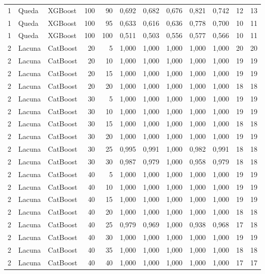 \begin{longtable}{@{}rllrrrrrrrrr@{}}
1 & Queda & XGBoost & 100 & 90 & 0,692 & 0,682 & 0,676 & 0,821 & 0,742 & 12 & 13 \\
1 & Queda & XGBoost & 100 & 95 & 0,633 & 0,616 & 0,636 & 0,778 & 0,700 & 10 & 11 \\
1 & Queda & XGBoost & 100 & 100 & 0,511 & 0,503 & 0,556 & 0,577 & 0,566 & 10 & 11 \\
2 & Lacuna & CatBoost & 20 & 5 & 1,000 & 1,000 & 1,000 & 1,000 & 1,000 & 20 & 20 \\
2 & Lacuna & CatBoost & 20 & 10 & 1,000 & 1,000 & 1,000 & 1,000 & 1,000 & 19 & 19 \\
2 & Lacuna & CatBoost & 20 & 15 & 1,000 & 1,000 & 1,000 & 1,000 & 1,000 & 19 & 19 \\
2 & Lacuna & CatBoost & 20 & 20 & 1,000 & 1,000 & 1,000 & 1,000 & 1,000 & 18 & 18 \\
2 & Lacuna & CatBoost & 30 & 5 & 1,000 & 1,000 & 1,000 & 1,000 & 1,000 & 19 & 19 \\
2 & Lacuna & CatBoost & 30 & 10 & 1,000 & 1,000 & 1,000 & 1,000 & 1,000 & 19 & 19 \\
2 & Lacuna & CatBoost & 30 & 15 & 1,000 & 1,000 & 1,000 & 1,000 & 1,000 & 18 & 18 \\
2 & Lacuna & CatBoost & 30 & 20 & 1,000 & 1,000 & 1,000 & 1,000 & 1,000 & 19 & 19 \\
2 & Lacuna & CatBoost & 30 & 25 & 0,995 & 0,991 & 1,000 & 0,982 & 0,991 & 18 & 18 \\
2 & Lacuna & CatBoost & 30 & 30 & 0,987 & 0,979 & 1,000 & 0,958 & 0,979 & 18 & 18 \\
2 & Lacuna & CatBoost & 40 & 5 & 1,000 & 1,000 & 1,000 & 1,000 & 1,000 & 19 & 19 \\
2 & Lacuna & CatBoost & 40 & 10 & 1,000 & 1,000 & 1,000 & 1,000 & 1,000 & 19 & 19 \\
2 & Lacuna & CatBoost & 40 & 15 & 1,000 & 1,000 & 1,000 & 1,000 & 1,000 & 19 & 19 \\
2 & Lacuna & CatBoost & 40 & 20 & 1,000 & 1,000 & 1,000 & 1,000 & 1,000 & 18 & 18 \\
2 & Lacuna & CatBoost & 40 & 25 & 0,979 & 0,969 & 1,000 & 0,938 & 0,968 & 17 & 18 \\
2 & Lacuna & CatBoost & 40 & 30 & 1,000 & 1,000 & 1,000 & 1,000 & 1,000 & 19 & 19 \\
2 & Lacuna & CatBoost & 40 & 35 & 1,000 & 1,000 & 1,000 & 1,000 & 1,000 & 18 & 18 \\
2 & Lacuna & CatBoost & 40 & 40 & 1,000 & 1,000 & 1,000 & 1,000 & 1,000 & 17 & 17 \\

\end{longtable}
